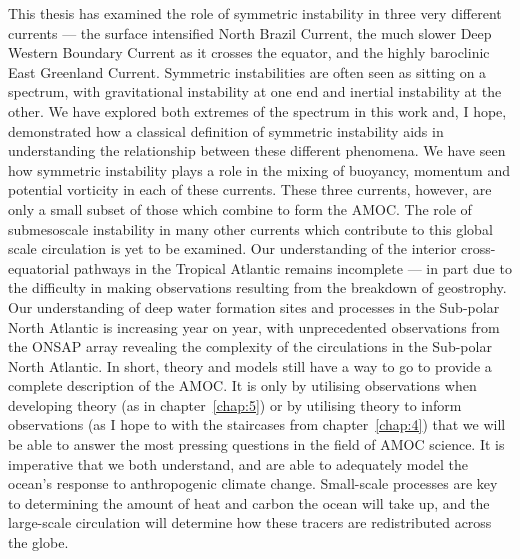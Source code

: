 This thesis has examined the role of symmetric instability in three very different currents --- the surface intensified North Brazil Current, the much slower Deep Western Boundary Current as it crosses the equator, and the highly baroclinic East Greenland Current. Symmetric instabilities are often seen as sitting on a spectrum, with gravitational instability at one end and inertial instability at the other. We have explored both extremes of the spectrum in this work and, I hope, demonstrated how a classical definition of symmetric instability aids in understanding the relationship between these different phenomena. We have seen how symmetric instability plays a role in the mixing of buoyancy, momentum and potential vorticity in each of these currents. These three currents, however, are only a small subset of those which combine to form the AMOC. The role of submesoscale instability in many other currents which contribute to this global scale circulation is yet to be examined. Our understanding of the interior cross-equatorial pathways in the Tropical Atlantic remains incomplete --- in part due to the difficulty in making observations resulting from the breakdown of geostrophy. Our understanding of deep water formation sites and processes in the Sub-polar North Atlantic is increasing year on year, with unprecedented observations from the ONSAP array revealing the complexity of the circulations in the Sub-polar North Atlantic. In short, theory and models still have a way to go to provide a complete description of the AMOC. It is only by utilising observations when developing theory (as in chapter~\ref{chap:5}) or by utilising theory to inform observations (as I hope to with the staircases from chapter~\ref{chap:4}) that we will be able to answer the most pressing questions in the field of AMOC science. It is imperative that we both understand, and are able to adequately model the ocean's response to anthropogenic climate change. Small-scale processes are key to determining the amount of heat and carbon the ocean will take up, and the large-scale circulation will determine how these tracers are redistributed across the globe.
